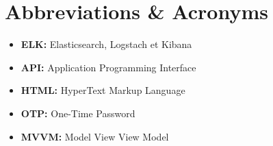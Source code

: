 \chapter*{Abbreviations \& Acronyms}

\begin{itemize}
	\item \textbf{ELK:}  Elasticsearch, Logstach et Kibana
	\item \textbf{API:}  Application Programming Interface
	\item \textbf{HTML:}  HyperText Markup Language
	\item \textbf{OTP:} One-Time Password
	\item \textbf{MVVM:} Model View View Model
\end{itemize}